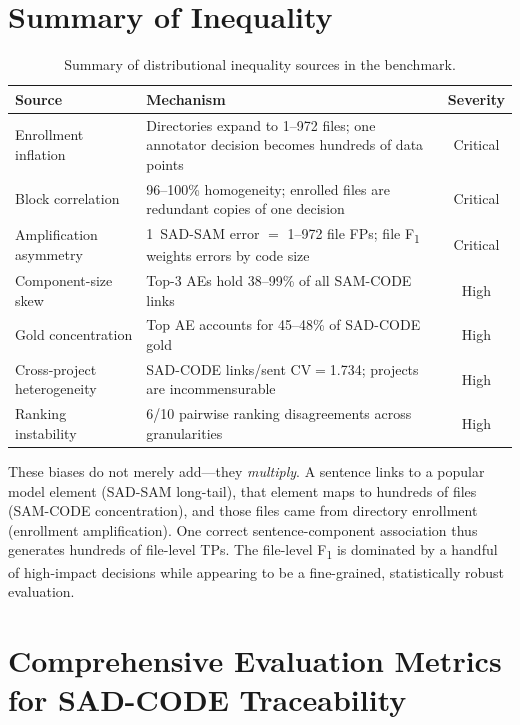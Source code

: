 \documentclass[11pt,a4paper]{report}
\newcommand{\sadcode}{SAD-CODE\xspace}
\newcommand{\sadsam}{SAD-SAM\xspace}
\newcommand{\samcode}{SAM-CODE\xspace}
\newcommand{\fone}{F\textsubscript{1}\xspace}
\begin{document}
\section{Summary of Inequality}
\label{sec:ineq:summary}

\begin{table}[h]
\caption{Summary of distributional inequality sources in the benchmark.}
\label{tab:ineq_summary}
\centering\small
\begin{tabular}{lp{6cm}c}
\toprule
\textbf{Source} & \textbf{Mechanism} & \textbf{Severity} \\
\midrule
Enrollment inflation & Directories expand to 1--972 files; one annotator decision becomes hundreds of data points & Critical \\
Block correlation & 96--100\% homogeneity; enrolled files are redundant copies of one decision & Critical \\
Amplification asymmetry & 1~SAD-SAM error $=$ 1--972 file FPs; file \fone weights errors by code size & Critical \\
Component-size skew & Top-3 AEs hold 38--99\% of all SAM-CODE links & High \\
Gold concentration & Top AE accounts for 45--48\% of SAD-CODE gold & High \\
Cross-project heterogeneity & SAD-CODE links/sent CV$=$1.734; projects are incommensurable & High \\
Ranking instability & 6/10 pairwise ranking disagreements across granularities & High \\
\bottomrule
\end{tabular}
\end{table}

These biases do not merely add---they \emph{multiply}. A sentence links to a
popular model element (\sadsam long-tail), that element maps to hundreds of
files (\samcode concentration), and those files came from directory enrollment
(enrollment amplification). One correct sentence-component association thus
generates hundreds of file-level TPs. The file-level \fone is dominated by a
handful of high-impact decisions while appearing to be a fine-grained,
statistically robust evaluation.



\section{Comprehensive Evaluation Metrics for \sadcode Traceability}
\label{sec:comprehensive-metrics}
\label{ch:eval}
\end{document}
